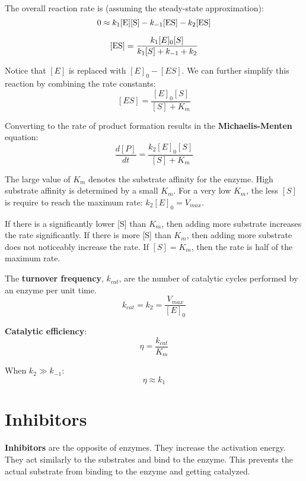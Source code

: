 \documentclass{article}
\begin{document}
The overall reaction rate is (assuming the steady-state approximation):
$$ 0 \approx k_{1}[\ce{E}][\ce{S}] - k_{-1}[\ce{ES}] - k_{2}[\ce{ES}] $$

$$ [\ce{ES}] = \frac{ k_{1}[E]_{0}[S] }{ k_{1}[S] +k_{-1} + k_{2} } $$

Notice that $[E]$ is replaced with $[E]_{0} - [ES]$. We can further simplify
this reaction by combining the rate constants:
$$ [ES] = \frac{ [E]_{0}[S] }{ [S] + K_{m} } $$

Converting to the rate of product formation results in the
\textbf{Michaelis-Menten} equation:
$$ \frac{ d[P] }{ dt } = \frac{ k_{2} [E]_{0}[S] }{ [S] + K_{m} } $$

The large value of $K_{m}$ denotes the substrate affinity for the enzyme.  High
substrate affinity is determined by a small $K_{m}$. For a very low $K_{m}$, the
less $[S]$ is require to reach the maximum rate: $k_{2}[E]_{0} = V_{max}$.

If there is a significantly lower [S] than $K_{m}$, then adding more substrate
increases the rate significantly. If there is more [S] than $K_{m}$, then adding
more substrate does not noticeably increase the rate. If $[S] = K_{m}$, then the
rate is half of the maximum rate.

The \textbf{turnover frequency}, $k_{cat}$, are the number of catalytic cycles
performed by an enzyme per unit time.
$$ k_{cat} = k_{2} = \frac{ V_{max} }{ [E]_{0} } $$

\textbf{Catalytic efficiency}:
$$ \eta = \frac{ k_{cat} }{ K_{m} } $$

When $k_{2} \gg k_{-1}$:
$$ \eta \approx k_{1} $$

\section{Inhibitors}

\textbf{Inhibitors} are the opposite of enzymes. They increase the activation
energy. They act similarly to the substrates and bind to the enzyme. This
prevents the actual substrate from binding to the enzyme and getting catalyzed.
\end{document}
